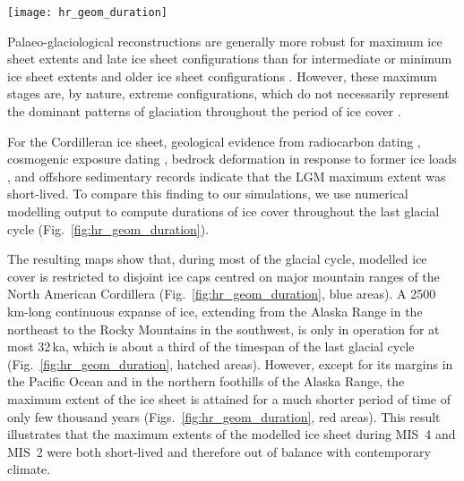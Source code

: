 \documentclass[tc, manuscript]{copernicus}
\begin{document}
\begin{figure*}
  \texttt{[image: hr\_geom\_duration]}
  \caption{Modelled duration of ice cover during the last 120\,ka using GRIP
           and EPICA climate forcing.
           Note the irregular colour scale. A continuous ice cover spanning
           from the Alaska Range (AR) to the Coast Mountains (CM) and
           the Columbia and Rocky mountains (CRM) exists for about 32\,ka in
           the GRIP simulation and 26\,ka in the EPICA simulation.
           The maximum extent of the ice sheet generally
           corresponds to relatively short durations of ice cover, but ice
           cover persists over the Skeena Mountains (SM) during most of the
           simulation. See Fig.~\ref{fig:locmap} for a list of abbreviations.}
  \label{fig:hr_geom_duration}
\end{figure*}

Palaeo-glaciological reconstructions are generally more robust
for maximum ice sheet extents and late ice sheet configurations than for
intermediate or minimum ice sheet extents and older ice sheet configurations
\citep{Kleman.etal.2010}. However,
these maximum stages are, by nature, extreme configurations, which do not
necessarily represent the dominant patterns of glaciation throughout the period
of ice cover \citep{Porter.1989, Kleman.Stroeven.1997, Kleman.etal.2008,
Kleman.etal.2010}.

For the Cordilleran ice sheet, geological evidence from radiocarbon dating
    \citep{Clague.etal.1980, Clague.1985, Clague.1986, Porter.Swanson.1998,
           Menounos.etal.2008},
cosmogenic exposure dating
    \citep{Stroeven.etal.2010, Stroeven.etal.2014, Margold.etal.2014},
bedrock deformation in response to former ice loads
    \citep{Clague.James.2002, Clague.etal.2005},
and offshore sedimentary records
    \citep{Cosma.etal.2008, Davies.etal.2011}
indicate that the LGM maximum extent was short-lived. To compare this finding
to our simulations, we use numerical modelling output
to compute durations of ice cover throughout the last glacial
cycle (Fig.~\ref{fig:hr_geom_duration}).

The resulting maps show that, during most of the glacial cycle, modelled ice
cover is restricted to disjoint ice caps centred on major mountain ranges of
the North American Cordillera (Fig.~\ref{fig:hr_geom_duration}, blue areas). A
2500\,km-long continuous expanse of ice, extending from the Alaska Range in the
northeast to the Rocky Mountains in the southwest, is only in operation
for at most 32\,ka, which is about a third of the timespan of the last glacial cycle
(Fig.~\ref{fig:hr_geom_duration}, hatched areas). However, except for its margins in
the Pacific Ocean and in the northern foothills of the Alaska Range,
the maximum extent of the ice sheet is attained for a much shorter period
of time of only few thousand years (Figs.~\ref{fig:hr_geom_duration}, red areas). This
result illustrates that the maximum extents of the modelled ice sheet during
MIS~4 and MIS~2 were both short-lived and therefore out of balance with
contemporary climate.
\end{document}
